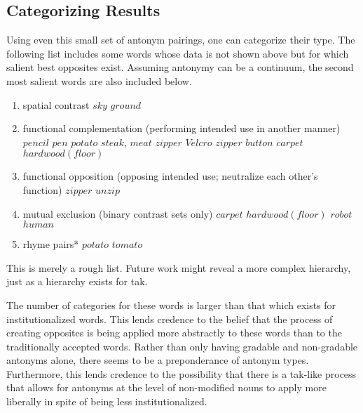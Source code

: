 \subsection {Categorizing Results} Using even this small set of antonym pairings, one can categorize their type.  The following list includes some words whose data is not shown above but for which salient best opposites exist.  Assuming antonymy can be a continuum, the second most salient words are also included below.
	\begin {enumerate}
		\item spatial contrast
			\subitem $sky$ \opp $ground$
		\item functional complementation (performing intended use in another manner) 
			\subitem $pencil$ \opp $pen$
			\subitem $potato$ \opp $steak$, $meat$
			\subitem $zipper$ \opp $Velcro$
			\subitem $zipper$ \opp $button$
			\subitem $carpet$ \opp $hardwood (floor)$
		\item functional opposition (opposing intended use; neutralize each other’s function) 
			\subitem $zipper$ \opp $unzip$
		\item mutual exclusion (binary contrast sets only)
			\subitem $carpet$ \opp $hardwood (floor)$
			\subitem $robot$ \opp $human$
		\item rhyme pairs*
			\subitem $potato$ \opp $tomato$
	\end {enumerate}

This is merely a rough list.  Future work might reveal a more complex hierarchy, just as a hierarchy exists for tak.  

The number of categories for these words is larger than that which exists for institutionalized words.  This lends credence to the belief that the process of creating opposites is being applied more abstractly to these words than to the traditionally accepted words. Rather than only having gradable and non-gradable antonyms alone, there seems to be a preponderance of antonym types.  Furthermore, this lends credence to the possibility that there is a tak-like process that allows for antonyms at the level of non-modified nouns to apply more liberally in spite of being less institutionalized.